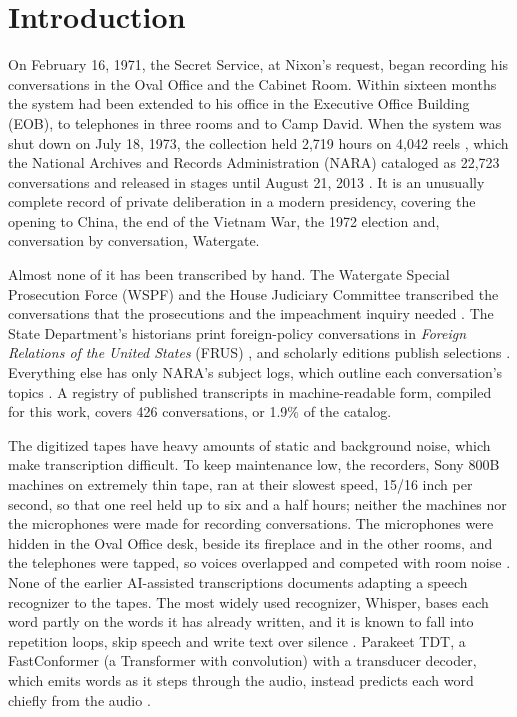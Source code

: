 \section{Introduction}
\label{sec:intro}

On February 16, 1971, the Secret Service, at Nixon's request, began recording his conversations in the Oval Office and the Cabinet Room. Within sixteen months the system had been extended to his office in the Executive Office Building (EOB), to telephones in three rooms and to Camp David. When the system was shut down on July 18, 1973, the collection held 2,719 hours on 4,042 reels \citep{nixonlib2019findingaid}, which the National Archives and Records Administration (NARA) cataloged as 22,723 conversations \citep{nara2024conversations} and released in stages until August 21, 2013 \citep{nixonlib2019findingaid}. It is an unusually complete record of private deliberation in a modern presidency, covering the opening to China, the end of the Vietnam War, the 1972 election and, conversation by conversation, Watergate.

Almost none of it has been transcribed by hand. The Watergate Special Prosecution Force (WSPF) and the House Judiciary Committee transcribed the conversations that the prosecutions and the impeachment inquiry needed \citep{wspf,hjc1974eight}. The State Department's historians print foreign-policy conversations in \textit{Foreign Relations of the United States} (FRUS) \citep{frus1969}, and scholarly editions publish selections \citep{kutler1997abuse,brinkley2014nixontapes,brinkley2015nixontapes1973,prde2014nixon,dean2014defense}. Everything else has only NARA's subject logs, which outline each conversation's topics \citep{nixonlib2010subjectlogs}. A registry of published transcripts in machine-readable form, compiled for this work, covers 426 conversations, or 1.9\% of the catalog.

The digitized tapes have heavy amounts of static and background noise, which make transcription difficult. To keep maintenance low, the recorders, Sony 800B machines on extremely thin tape, ran at their slowest speed, 15/16 inch per second, so that one reel held up to six and a half hours; neither the machines nor the microphones were made for recording conversations. The microphones were hidden in the Oval Office desk, beside its fireplace and in the other rooms, and the telephones were tapped, so voices overlapped and competed with room noise \citep{nixonlib2019findingaid}. None of the earlier AI-assisted transcriptions \citep{fine2026easynixon,hoover2026nixon,ferguson2026unlocked} documents adapting a speech recognizer to the tapes. The most widely used recognizer, Whisper, bases each word partly on the words it has already written, and it is known to fall into repetition loops, skip speech and write text over silence \citep{radford2023whisper,koenecke2024careless,baranski2025hallucination,bain2023whisperx}. Parakeet TDT, a FastConformer (a Transformer with convolution) with a transducer decoder, which emits words as it steps through the audio, instead predicts each word chiefly from the audio \citep{xu2023tdt,nvidia2025parakeetv3}.

